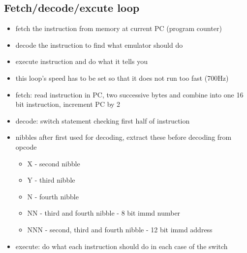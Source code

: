\documentclass{article}
\begin{document}
\subsection*{Fetch/decode/excute loop}
\begin{itemize}
	\item fetch the instruction from memory at current PC (program counter)
	\item decode the instruction to find what emulator should do
	\item execute instruction and do what it tells you
	\item this loop's speed has to be set so that it does not run too fast (700Hz)
	\item fetch: read instruction in PC, two successive bytes and combine into one 16 bit instruction, increment PC by 2
	\item decode: switch statement checking first half of instruction 
	\item nibbles after first used for decoding, extract these before decoding from opcode
	\begin{itemize}
		\item X - second nibble
		\item Y - third nibble
		\item N - fourth nibble
		\item NN - third and fourth nibble - 8 bit immd number
		\item NNN - second, third and fourth nibble - 12 bit immd address 
	\end{itemize}
	\item execute: do what each instruction should do in each case of the switch
\end{itemize}
\end{document}
